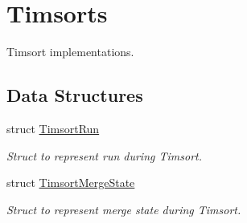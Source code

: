 \hypertarget{group__Timsort}{}\section{Timsorts}
\label{group__Timsort}


Timsort implementations.  


\subsection*{Data Structures}
\begin{DoxyCompactItemize}
\item 
struct \hyperlink{structTimsortRun}{Timsort\+Run}
\begin{DoxyCompactList}\small\item\em Struct to represent run during Timsort. \end{DoxyCompactList}\item 
struct \hyperlink{structTimsortMergeState}{Timsort\+Merge\+State}
\begin{DoxyCompactList}\small\item\em Struct to represent merge state during Timsort. \end{DoxyCompactList}\end{DoxyCompactItemize}
